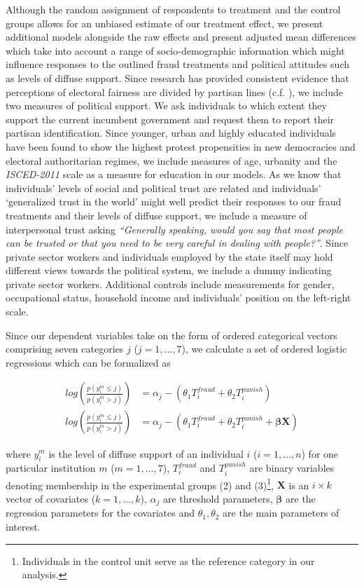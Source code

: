 \documentclass[11pt, ngerman,english,a4]{article}
\begin{document}
Although the random assignment of respondents to treatment and the control groups allows for an unbiased estimate of our treatment effect, we present additional models alongside the raw effects and present adjusted mean differences which take into account a range of socio-demographic information which might influence responses to the outlined fraud treatments and political attitudes such as levels of diffuse support. Since research has provided consistent evidence that perceptions of electoral fairness are divided by partisan lines (c.f. \citealt{Cantu2015}), we include two measures of political support. We ask individuals to which extent they support the current incumbent government and request them to report their partisan identification. Since younger, urban and highly educated individuals have been found to show the highest protest propensities in new democracies and electoral authoritarian regimes, we include measures of age, urbanity and the \textit{ISCED-2011} scale as a measure for education in our models. As we know that individuals’ levels of social and political trust are related and individuals’ `generalized trust in the world’ might well predict their responses to our fraud treatments and their levels of diffuse support, we include a measure of interpersonal trust asking \textit{“Generally speaking, would you say that most people can be trusted or that you need to be very careful in dealing with people?”}. Since private sector workers and individuals employed by the state itself may hold different views towards the political system, we include a dummy indicating private sector workers. Additional controls include measurements for gender, occupational status, household income and individuals’ position on the left-right scale.  

Since our dependent variables take on the form of ordered categorical vectors comprising seven categories $j$ ($j=1,...,7$), we calculate a set of ordered logistic regressions which can be formalized as

\begin{equation}
 \begin{split}
log(\frac{p(y^{m}_i \leq j)}{p(y^{m}_i > j)}) & = \alpha_j - (\theta_1 T_i^{fraud} + \theta_2 T_i^{punish})  \\
log(\frac{p(y^{m}_i \leq j)}{p(y^{m}_i > j)}) & = \alpha_j - (\theta_1 T_i^{fraud} + \theta_2 T_i^{punish} + \bm{\beta} \bm{X}) 
\end{split}
\end{equation}

\noindent where $y^m_i$ is the level of diffuse support of an individual $i$ ($i=1,...,n$) for one particular institution $m$ ($m=1,...,7$), $T_i^{fraud}$ and $T_i^{punish}$ are binary variables denoting membership in the experimental groups (2) and (3)\footnote{Individuals in the control unit serve as the reference category in our analysis.}, $\bm{X}$ is an $i \times k$ vector of covariates ($k=1,...,k$), $\alpha_j$ are threshold parameters, $\bm{\beta}$ are the regression parameters for the covariates and $\theta_1, \theta_2$ are the main parameters of interest.
\end{document}
